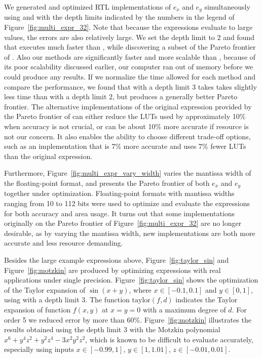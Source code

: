 We generated and optimized RTL implementations of $e_x$ and $e_y$
simultaneously using \frontiertrace{} and \greedytrace{} with the depth limits
indicated by the numbers in the legend of Figure~\ref{fig:multi_expr_32}. Note
that because the expressions evaluate to large values, the errors are also
relatively large. We set the depth limit to $2$ and found that \greedytrace{}
executes much faster than \frontiertrace{}, while discovering a subset of
the Pareto frontier of \frontiertrace{}. Also our methods are significantly
faster and more scalable than \marteltrace{}, because of its poor scalability
discussed earlier, our computer ran out of memory before we could produce
any results. If we normalize the time allowed for each method and compare
the performance, we found that \greedytrace{} with a depth limit $3$ takes
takes slightly less time than \frontiertrace{} with a depth limit $2$, but
produces a generally better Pareto frontier. The alternative implementations
of the original expression provided by the Pareto frontier of \greedytrace{}
can either reduce the LUTs used by approximately 10\% when accuracy is not
crucial, or can be about 10\% more accurate if resource is not our concern.
It also enables the ability to choose different trade-off options, such as
an implementation that is 7\% more accurate and uses 7\% fewer LUTs than the
original expression.

Furthermore, Figure~\ref{fig:multi_expr_vary_width} varies the mantissa
width of the floating-point format, and presents the Pareto frontier
of both $e_x$ and $e_y$ together under optimization. Floating-point
formats with mantissa widths ranging from 10 to 112 bits were used to
optimize and evaluate the expressions for both accuracy and area usage. It
turns out that some implementations originally on the Pareto frontier of
Figure~\ref{fig:multi_expr_32} are no longer desirable, as by varying the
mantissa width, new implementations are both more accurate and less resource
demanding.

Besides the large example expressions above, Figure~\ref{fig:taylor_sin} and
Figure~\ref{fig:motzkin} are produced by optimizing expressions with real
applications under single precision. Figure~\ref{fig:taylor_sin} shows the
optimization of the Taylor expansion of $\sin(x + y)$, where $x\in[-0.1, 0.1]$
and $y\in[0, 1]$, using \greedytrace{} with a depth limit $3$. The function
$\mathrm{taylor}(f, d)$ indicates the Taylor expansion of function $f(x, y)$ at
$x = y = 0$ with a maximum degree of $d$. For order 5 we reduced error by more
than 60\%. Figure~\ref{fig:motzkin} illustrates the results obtained using the
depth limit $3$ with the Motzkin polynomial~\cite{demmel} $x^6 + y^4 z^2 + y^2
z^4 - 3 x^2 y^2 z^2$, which is known to be difficult to evaluate accurately,
especially using inputs $x\in[-0.99, 1]$, $y\in[1, 1.01]$, $z\in[-0.01, 0.01]$.

